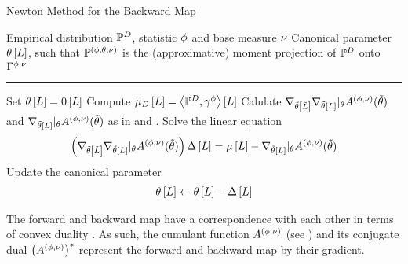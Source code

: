 \begin{algorithm}
    \caption{Newton Method for the Backward Map}\label{alg:newtonBackward}
    \begin{algorithmic}
        \Require Empirical distribution $\mathbb{P}^{D}$, statistic $\phi$ and base measure $\nu$
        \Ensure Canonical parameter $\theta\left[L\right]$, such that $\mathbb{P}^{(\phi,\theta,\nu)}$ is the (approximative) moment projection of $\mathbb{P}^{D}$ onto $\Gamma^{\phi,\nu}$
        \hrule
        \State Set $\theta\left[L\right]=0\left[L\right]$
        \State Compute $\mu_{D}\left[L\right]= \left\langle \mathbb{P}^{D},\gamma^{\phi}\right\rangle \left[ L \right]$
            \State Calulate $\nabla_{\tilde{\theta}\left[\tilde{L}\right]}\nabla_{\tilde{\theta}\left[L\right]}|_{\theta} A^{(\phi,\nu)}(\tilde{\theta})$ and  $\nabla_{\tilde{\theta}\left[L\right]}|_{\theta} A^{(\phi,\nu)}(\tilde{\theta})$ as in  and .
            \State Solve the linear equation
                \begin{align*}
                   \left(\nabla_{\tilde{\theta}\left[\tilde{L}\right]}\nabla_{\tilde{\theta}\left[L\right]}|_{\theta} A^{(\phi,\nu)}(\tilde{\theta})\right)  \Delta\left[L\right]
                    = \mu\left[L\right] - \nabla_{\tilde{\theta}\left[L\right]}|_{\theta} A^{(\phi,\nu)}(\tilde{\theta})
                \end{align*}
            \State Update the canonical parameter
                \begin{align*}
                    \theta\left[L\right] \leftarrow \theta\left[L\right] - \Delta\left[L\right]
                \end{align*}
        \EndWhile
    \end{algorithmic}
\end{algorithm}



%

The forward and backward map have a correspondence with each other in terms of convex duality \cite{rockafellar_convex_1997}.
As such, the cumulant function $A^{(\phi,\nu)}$ (see ) and its conjugate dual $\big(A^{(\phi,\nu)}\big)^*$ represent the forward and backward map by their gradient.

